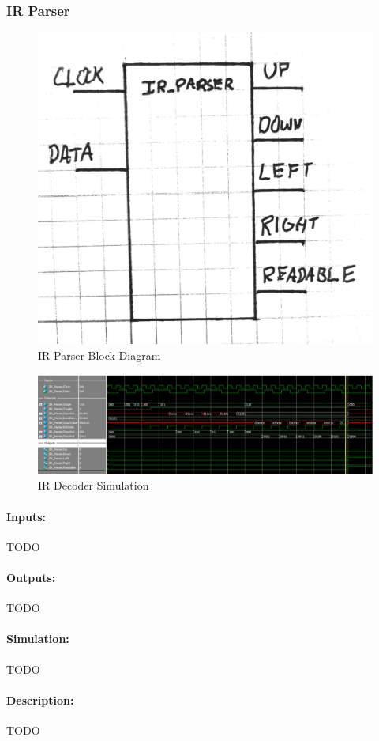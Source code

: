\documentclass[]{article}
\begin{document}
\subsubsection{IR Parser}
\begin{figure}[H]\centering
    \includegraphics[width=0.5\linewidth]{figures/IR_Parser_Block.jpg}
    \caption{IR Parser Block Diagram}
    \label{fig:irParserBlock}
\end{figure}
\begin{figure}[H]\centering
    \includegraphics[width=\linewidth]{figures/IR_Parser_Sim.png}
    \caption{IR Decoder Simulation}
    \label{fig:irParserSim}
\end{figure}
\paragraph{Inputs:} TODO
\paragraph{Outputs:} TODO
\paragraph{Simulation:} TODO
\paragraph{Description:} TODO
\end{document}
